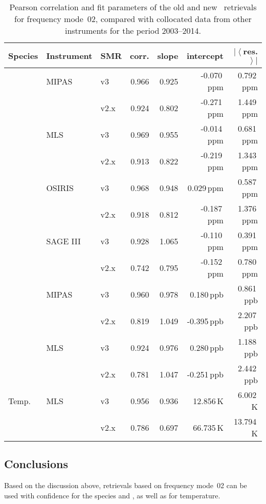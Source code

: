 \begin{table}[tbhp]
\centering
\caption{Pearson correlation and fit parameters of the old and new \smr\
retrievals for frequency mode~02, compared with collocated data from other
instruments for the period 2003--2014.
}
\label{tab:fm02:stats}
\begin{tabular}{lllrrrr}
    \toprule
    \textbf{Species} & \textbf{Instrument} & \textbf{SMR} & \textbf{corr.} & \textbf{slope} & \textbf{intercept} & \textbf{$\left|\left<\right.\right.$res.$\left.\left.\right>\right|$} \\
    \midrule
    \chem{O3}       & MIPAS     & v3    & 0.966 & 0.925 & -0.070\,ppm   & 0.792\,ppm \\
                    &           & v2.x  & 0.924 & 0.802 & -0.271\,ppm   & 1.449\,ppm \\
    \cline{2-7}
                    & MLS       & v3    & 0.969 & 0.955 & -0.014\,ppm   & 0.681\,ppm \\
                    &           & v2.x  & 0.913 & 0.822 & -0.219\,ppm   & 1.343\,ppm \\
    \cline{2-7}
                    & OSIRIS    & v3    & 0.968 & 0.948 & 0.029\,ppm    & 0.587\,ppm \\
                    &           & v2.x  & 0.918 & 0.812 & -0.187\,ppm   & 1.376\,ppm \\
    \cline{2-7}
                    & SAGE III  & v3    & 0.928 & 1.065 & -0.110\,ppm   & 0.391\,ppm \\
                    &           & v2.x  & 0.742 & 0.795 & -0.152\,ppm   & 0.780\,ppm \\
    \midrule
    \chem{HNO_3}    & MIPAS     & v3    & 0.960 & 0.978 & 0.180\,ppb    & 0.861\,ppb \\
                    &           & v2.x  & 0.819 & 1.049 & -0.395\,ppb    & 2.207\,ppb \\
    \cline{2-7}
                    & MLS       & v3    & 0.924 & 0.976 & 0.280\,ppb    & 1.188\,ppb \\
                    &           & v2.x  & 0.781 & 1.047 & -0.251\,ppb    & 2.442\,ppb \\
    \midrule
    Temp.           & MLS       & v3    & 0.956 & 0.936 & 12.856\,K     &  6.002\,K \\
                    &           & v2.x  & 0.786 & 0.697 & 66.735\,K     & 13.794\,K \\
    \bottomrule
\end{tabular}
\end{table}

\subsection{Conclusions}
\label{sec:fm02:conclusions}

Based on the discussion above, retrievals based on frequency mode~02 can be
used with confidence for the species \chem{O_3} and \chem{HNO_3}, as well as
for temperature.
